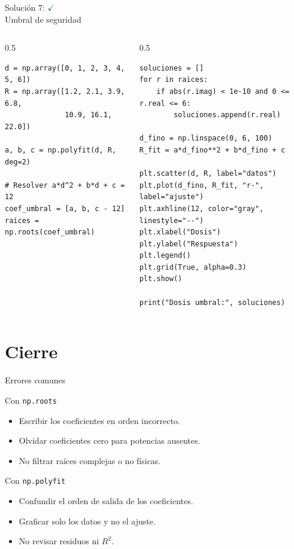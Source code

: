 \documentclass[10pt]{beamer}
\begin{document}
\begin{solutionblock}
\begin{frame}[fragile]{Solución 7: \hfill \textcolor{green}{$\checkmark$} \\ Umbral de seguridad}
\begin{columns}
\begin{column}{0.5\textwidth}
\begin{verbatim}
d = np.array([0, 1, 2, 3, 4, 5, 6])
R = np.array([1.2, 2.1, 3.9, 6.8,
              10.9, 16.1, 22.0])

a, b, c = np.polyfit(d, R, deg=2)

# Resolver a*d^2 + b*d + c = 12
coef_umbral = [a, b, c - 12]
raices = np.roots(coef_umbral)
\end{verbatim}
\end{column}
\begin{column}{0.5\textwidth}
\begin{verbatim}
soluciones = []
for r in raices:
    if abs(r.imag) < 1e-10 and 0 <= r.real <= 6:
        soluciones.append(r.real)

d_fino = np.linspace(0, 6, 100)
R_fit = a*d_fino**2 + b*d_fino + c

plt.scatter(d, R, label="datos")
plt.plot(d_fino, R_fit, "r-", label="ajuste")
plt.axhline(12, color="gray", linestyle="--")
plt.xlabel("Dosis")
plt.ylabel("Respuesta")
plt.legend()
plt.grid(True, alpha=0.3)
plt.show()

print("Dosis umbral:", soluciones)
\end{verbatim}
\end{column}
\end{columns}
\end{frame}
\end{solutionblock}

\section{Cierre}

\begin{frame}{Errores comunes}
  \begin{block}{Con \texttt{np.roots}}
    \begin{itemize}
      \item Escribir los coeficientes en orden incorrecto.
      \item Olvidar coeficientes cero para potencias ausentes.
      \item No filtrar raíces complejas o no físicas.
    \end{itemize}
  \end{block}

  \begin{block}{Con \texttt{np.polyfit}}
    \begin{itemize}
      \item Confundir el orden de salida de los coeficientes.
      \item Graficar solo los datos y no el ajuste.
      \item No revisar residuos ni \(R^2\).
    \end{itemize}
  \end{block}
\end{frame}
\end{document}
